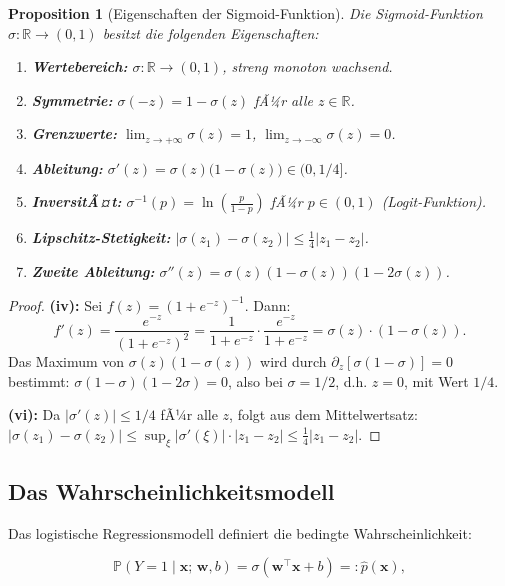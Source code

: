 ﻿\documentclass[12pt, a4paper]{article}
\newtheorem{proposition}[theorem]{Proposition}
\theoremstyle{definition}
\theoremstyle{remark}
\newcommand{\R}{\mathbb{R}}
\newcommand{\Prob}{\mathbb{P}}
\newcommand{\sigmoid}{\sigma}
\newcommand{\vw}{\bm{w}}
\newcommand{\vx}{\bm{x}}
\newcommand{\T}{\top}
\begin{document}
\begin{proposition}[Eigenschaften der Sigmoid-Funktion]
  \label{prop:sigmoid_properties}
  Die Sigmoid-Funktion $\sigmoid: \R \to (0,1)$ besitzt die folgenden Eigenschaften:
  \begin{enumerate}[label=(\roman*)]
    \item \textbf{Wertebereich:} $\sigmoid : \R \to (0,1)$, streng monoton wachsend.
    \item \textbf{Symmetrie:} $\sigmoid(-z) = 1 - \sigmoid(z)$ fÃ¼r alle $z \in \R$.
    \item \textbf{Grenzwerte:} $\lim_{z\to+\infty}\sigmoid(z) = 1$, $\lim_{z\to-\infty}\sigmoid(z) = 0$.
    \item \textbf{Ableitung:} $\sigmoid'(z) = \sigmoid(z)\bigl(1 - \sigmoid(z)\bigr) \in (0, 1/4]$.
    \item \textbf{InversitÃ¤t:} $\sigmoid^{-1}(p) = \ln\!\left(\frac{p}{1-p}\right)$ fÃ¼r $p \in (0,1)$ (Logit-Funktion).
    \item \textbf{Lipschitz-Stetigkeit:} $|\sigmoid(z_1) - \sigmoid(z_2)| \leq \frac{1}{4}|z_1 - z_2|$.
    \item \textbf{Zweite Ableitung:} $\sigmoid''(z) = \sigmoid(z)(1-\sigmoid(z))(1-2\sigmoid(z))$.
  \end{enumerate}
\end{proposition}

\begin{proof}
  \textbf{(iv):} Sei $f(z) = (1+e^{-z})^{-1}$. Dann:
  \[
    f'(z) = \frac{e^{-z}}{(1+e^{-z})^2}
           = \frac{1}{1+e^{-z}} \cdot \frac{e^{-z}}{1+e^{-z}}
           = \sigmoid(z) \cdot (1-\sigmoid(z)).
  \]
  Das Maximum von $\sigmoid(z)(1-\sigmoid(z))$ wird durch $\partial_z[\sigmoid(1-\sigmoid)]=0$ bestimmt:
  $\sigmoid(1-\sigmoid)(1-2\sigmoid)=0$, also bei $\sigmoid=1/2$, d.h. $z=0$, mit Wert $1/4$.

  \textbf{(vi):} Da $|\sigmoid'(z)| \leq 1/4$ fÃ¼r alle $z$, folgt aus dem Mittelwertsatz:
  $|\sigmoid(z_1)-\sigmoid(z_2)| \leq \sup_\xi |\sigmoid'(\xi)| \cdot |z_1-z_2| \leq \frac{1}{4}|z_1-z_2|$. 
\end{proof}

\subsection{Das Wahrscheinlichkeitsmodell}

Das logistische Regressionsmodell definiert die bedingte Wahrscheinlichkeit:

\begin{equation}
  \Prob(Y = 1 \mid \vx;\, \vw, b) = \sigmoid(\vw^\T\vx + b) =: \hat{p}(\vx),
  \label{eq:prob_model}
\end{equation}
\end{document}
